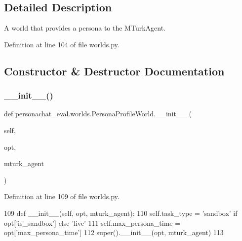 \subsection{Detailed Description}
\begin{DoxyVerb}A world that provides a persona to the MTurkAgent.
\end{DoxyVerb}
 

Definition at line 104 of file worlds.\+py.



\subsection{Constructor \& Destructor Documentation}
\mbox{\label{classpersonachat__eval_1_1worlds_1_1PersonaProfileWorld_a0db1c5d6b7402d0a487264ce21cc221a}} 
\subsubsection{\texorpdfstring{\+\_\+\+\_\+init\+\_\+\+\_\+()}{\_\_init\_\_()}}
{\footnotesize\ttfamily def personachat\+\_\+eval.\+worlds.\+Persona\+Profile\+World.\+\_\+\+\_\+init\+\_\+\+\_\+ (\begin{DoxyParamCaption}\item[{}]{self,  }\item[{}]{opt,  }\item[{}]{mturk\+\_\+agent }\end{DoxyParamCaption})}



Definition at line 109 of file worlds.\+py.


\begin{DoxyCode}
109     \textcolor{keyword}{def }\_\_init\_\_(self, opt, mturk\_agent):
110         self.task\_type = \textcolor{stringliteral}{'sandbox'} \textcolor{keywordflow}{if} opt[\textcolor{stringliteral}{'is\_sandbox'}] \textcolor{keywordflow}{else} \textcolor{stringliteral}{'live'}
111         self.max\_persona\_time = opt[\textcolor{stringliteral}{'max\_persona\_time'}]
112         super().\_\_init\_\_(opt, mturk\_agent)
113 
\end{DoxyCode}


